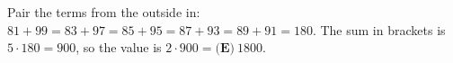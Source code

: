 Pair the terms from the outside in: $81+99=83+97=85+95=87+93=89+91=180$. The sum in brackets is $5\cdot180=900$, so the value is $2\cdot900=\boxed{\textbf{(E)}\ 1800}$.
